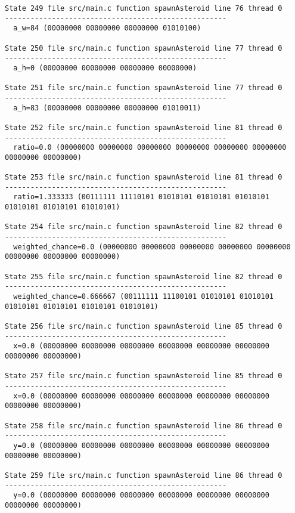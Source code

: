 \begin{verbatim}
State 249 file src/main.c function spawnAsteroid line 76 thread 0
----------------------------------------------------
  a_w=84 (00000000 00000000 00000000 01010100)

State 250 file src/main.c function spawnAsteroid line 77 thread 0
----------------------------------------------------
  a_h=0 (00000000 00000000 00000000 00000000)

State 251 file src/main.c function spawnAsteroid line 77 thread 0
----------------------------------------------------
  a_h=83 (00000000 00000000 00000000 01010011)

State 252 file src/main.c function spawnAsteroid line 81 thread 0
----------------------------------------------------
  ratio=0.0 (00000000 00000000 00000000 00000000 00000000 00000000 00000000 00000000)

State 253 file src/main.c function spawnAsteroid line 81 thread 0
----------------------------------------------------
  ratio=1.333333 (00111111 11110101 01010101 01010101 01010101 01010101 01010101 01010101)

State 254 file src/main.c function spawnAsteroid line 82 thread 0
----------------------------------------------------
  weighted_chance=0.0 (00000000 00000000 00000000 00000000 00000000 00000000 00000000 00000000)

State 255 file src/main.c function spawnAsteroid line 82 thread 0
----------------------------------------------------
  weighted_chance=0.666667 (00111111 11100101 01010101 01010101 01010101 01010101 01010101 01010101)

State 256 file src/main.c function spawnAsteroid line 85 thread 0
----------------------------------------------------
  x=0.0 (00000000 00000000 00000000 00000000 00000000 00000000 00000000 00000000)

State 257 file src/main.c function spawnAsteroid line 85 thread 0
----------------------------------------------------
  x=0.0 (00000000 00000000 00000000 00000000 00000000 00000000 00000000 00000000)

State 258 file src/main.c function spawnAsteroid line 86 thread 0
----------------------------------------------------
  y=0.0 (00000000 00000000 00000000 00000000 00000000 00000000 00000000 00000000)

State 259 file src/main.c function spawnAsteroid line 86 thread 0
----------------------------------------------------
  y=0.0 (00000000 00000000 00000000 00000000 00000000 00000000 00000000 00000000)


\end{verbatim}
